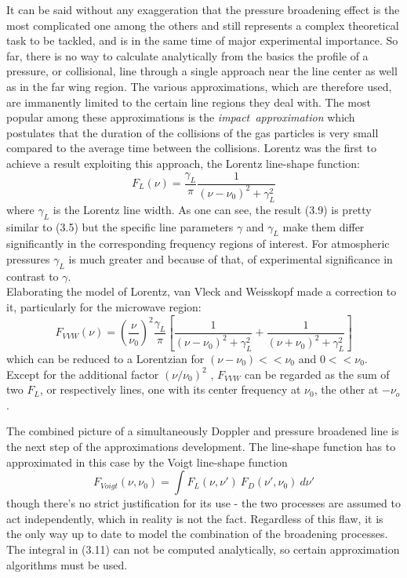 It can be said without any exaggeration that the pressure broadening
effect is the most complicated one among the others and still
represents a complex theoretical task to be tackled, and is in the
same time of major experimental importance. So far, there is no way to
calculate analytically from the basics the profile of a pressure, or
collisional, line through a single approach near the line center as
well as in the far wing region. The various approximations, which are
therefore used, are immanently limited to the certain line regions
they deal with.  The most popular among these approximations is the
{\it{impact~approximation}} which postulates that the duration of the
collisions of the gas particles is very small compared to the average
time between the collisions. Lorentz was the first to achieve a result
exploiting this approach, the Lorentz line-shape function:
\begin{equation}
 F_L(\nu)=\frac{\gamma_L}{\pi}\frac{1}{(\nu-\nu_0)^2+\gamma_L^2}
\end{equation}
where $\gamma_L$ is the Lorentz line width. As one can see, the result
(3.9) is pretty similar to (3.5) but the specific line parameters
$\gamma$ and $\gamma_L$ make them differ significantly in the
corresponding frequency regions of interest. For atmospheric pressures
$\gamma_L$ is much greater and because of that, of experimental
significance in contrast to $\gamma$.\\
Elaborating the model of Lorentz, van Vleck and Weisskopf made a
correction to it, particularly for the microwave region:
\begin{equation}
 F_{VVW} (\nu)=\left(\frac{\nu}{\nu_0}\right)^2\frac{\gamma_L}{\pi}\left[\frac{1}{(\nu-\nu_0)^2+\gamma_L^2}+\frac{1}{(\nu+\nu_0)^2+\gamma_L^2}\right]
\end{equation}
which can be reduced to a Lorentzian for $(\nu-\nu_0) << \nu_0$ and $0
<< \nu_0$. Except for the additional factor $(\nu/\nu_0)^2$ ,
$F_{VVW}$ can be regarded as the sum of two $F_L$, or respectively
lines, one with its center frequency at $\nu_0$, the other at
$-\nu_o$.

The combined picture of a simultaneously Doppler and pressure
broadened line is the next step of the approximations development. The
line-shape function has to approximated in this case by the Voigt line-shape
function 
\begin{equation}
 F_{Voigt}(\nu,\nu_0)= \int F_L(\nu,\nu')~F_D(\nu',\nu_0)~d\nu'
\end{equation}
though there's no strict justification for its use - the two processes
are assumed to act independently, which in reality is not the
fact. Regardless of this flaw, it is the only way up to date to model
the combination of the broadening processes. The integral in (3.11)
can not be computed analytically, so certain approximation algorithms
must be used.


